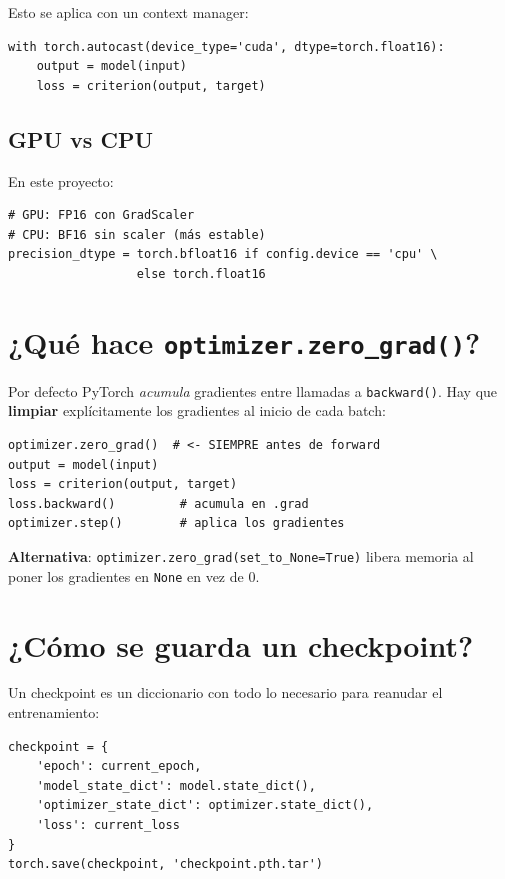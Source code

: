 \noindent Esto se aplica con un context manager:

\begin{verbatim}
with torch.autocast(device_type='cuda', dtype=torch.float16):
    output = model(input)
    loss = criterion(output, target)
\end{verbatim}

\subsection{GPU vs CPU}

En este proyecto:

\begin{verbatim}
# GPU: FP16 con GradScaler
# CPU: BF16 sin scaler (más estable)
precision_dtype = torch.bfloat16 if config.device == 'cpu' \
                  else torch.float16
\end{verbatim}

\section{¿Qué hace \texttt{optimizer.zero\_grad()}?}

Por defecto PyTorch \emph{acumula} gradientes entre llamadas a
\texttt{backward()}. Hay que \textbf{limpiar} explícitamente los
gradientes al inicio de cada batch:

\begin{verbatim}
optimizer.zero_grad()  # <- SIEMPRE antes de forward
output = model(input)
loss = criterion(output, target)
loss.backward()         # acumula en .grad
optimizer.step()        # aplica los gradientes
\end{verbatim}

\noindent\textbf{Alternativa}: \texttt{optimizer.zero\_grad(set\_to\_None=True)}
libera memoria al poner los gradientes en \texttt{None} en vez de
0.

\section{¿Cómo se guarda un checkpoint?}

Un checkpoint es un diccionario con todo lo necesario para
reanudar el entrenamiento:

\begin{verbatim}
checkpoint = {
    'epoch': current_epoch,
    'model_state_dict': model.state_dict(),
    'optimizer_state_dict': optimizer.state_dict(),
    'loss': current_loss
}
torch.save(checkpoint, 'checkpoint.pth.tar')
\end{verbatim}

